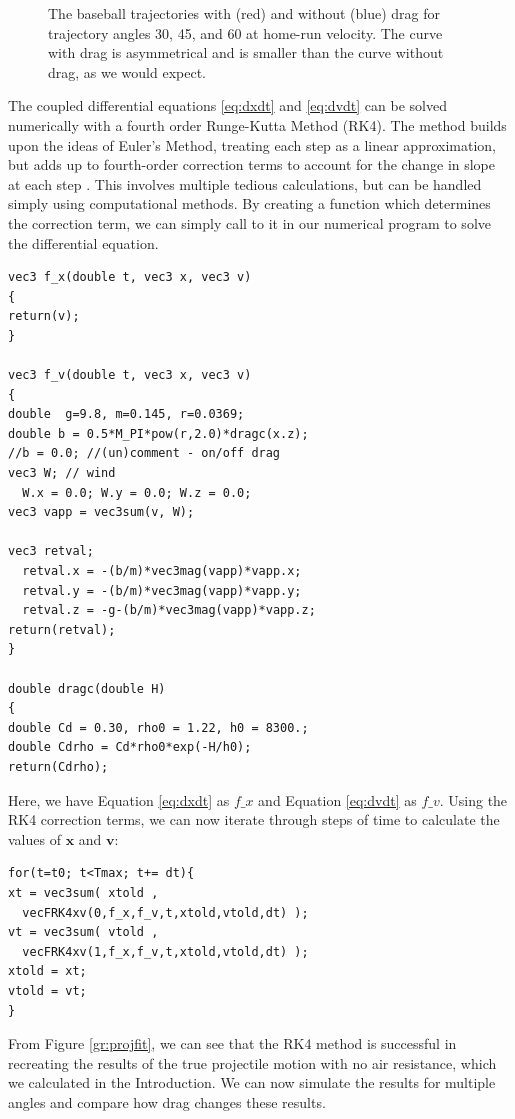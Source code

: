\documentclass[aps,prl,twocolumn,superscriptaddress]{revtex4-1}
\begin{document}
\begin{figure}[htbp]
\begin{center}
  		\caption{The baseball trajectories with (red) and without (blue) drag for trajectory angles 30, 45, and 60 at home-run velocity. The curve with drag is asymmetrical and is smaller than the curve without drag, as we would expect.}
  		\label{gr:proj}
 	\end{center}
\end{figure}

The coupled differential equations \ref{eq:dxdt} and \ref{eq:dvdt} can be solved numerically with a fourth order Runge-Kutta Method (RK4). The method builds upon the ideas of Euler's Method, treating each step as a linear approximation, but adds up to fourth-order correction terms to account for the change in slope at each step \cite{RK4}. This involves multiple tedious calculations, but can be handled simply using computational methods. By creating a function which determines the correction term, we can simply call to it in our numerical program to solve the differential equation. 

\begin{lstlisting}
vec3 f_x(double t, vec3 x, vec3 v)
{
return(v);
}

vec3 f_v(double t, vec3 x, vec3 v)
{
double  g=9.8, m=0.145, r=0.0369;
double b = 0.5*M_PI*pow(r,2.0)*dragc(x.z);
//b = 0.0; //(un)comment - on/off drag
vec3 W;	// wind
  W.x = 0.0; W.y = 0.0; W.z = 0.0;
vec3 vapp = vec3sum(v, W);

vec3 retval;
  retval.x = -(b/m)*vec3mag(vapp)*vapp.x;
  retval.y = -(b/m)*vec3mag(vapp)*vapp.y;
  retval.z = -g-(b/m)*vec3mag(vapp)*vapp.z;
return(retval);
}

double dragc(double H)
{
double Cd = 0.30, rho0 = 1.22, h0 = 8300.;
double Cdrho = Cd*rho0*exp(-H/h0);
return(Cdrho);
\end{lstlisting}
Here, we have Equation \ref{eq:dxdt} as $f\_x$ and Equation \ref{eq:dvdt} as $f\_v$. Using the RK4 correction terms, we can now iterate through steps of time to calculate the values of $\bm{x}$ and $\bm{v}$:
\begin{lstlisting}
for(t=t0; t<Tmax; t+= dt){
xt = vec3sum( xtold ,
  vecFRK4xv(0,f_x,f_v,t,xtold,vtold,dt) );
vt = vec3sum( vtold ,
  vecFRK4xv(1,f_x,f_v,t,xtold,vtold,dt) );
xtold = xt;
vtold = vt;
}
\end{lstlisting}
From Figure \ref{gr:projfit}, we can see that the RK4 method is successful in recreating the results of the true projectile motion with no air resistance, which we calculated in the Introduction.
We can now simulate the results for multiple angles and compare how drag changes these results.
\end{document}
